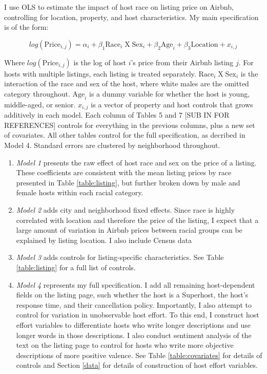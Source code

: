 \label{empirical}

I use OLS to estimate the impact of host race on listing price on Airbnb, controlling for location, property, and host characteristics. My main specification is of the form:

\[ log(\text{Price}_{i,j}) = \alpha_i + \beta_1 \text{Race}_{i} \;  \text{X} \; \text{Sex}_i + \beta_2 \text{Age}_i + \beta_3 \text{Location} +  x_{i,j} \]

Where $log(\text{Price}_{i,j})$ is the log of host $i$'s price from their Airbnb listing $j$. For hosts with multiple listings, each listing is treated separately. $\text{Race}_{i} \;  \text{X} \; \text{Sex}_i$ is the interaction of the race and sex of the host, where white males are the omitted category throughout. $\text{Age}_i$ is a dummy variable for whether the host is young, middle-aged, or senior. $x_{i,j}$ is a vector of property and host controls that grows additively in each model. Each column of Tables 5 and 7 [SUB IN FOR REFERENCES] controls for everything in the previous columns, plus a new set of covariates. All other tables control for the full specification, as decribed in Model 4. Standard errors are clustered by neighborhood throughout.

\begin{enumerate}
	\item \textit{Model 1} presents the raw effect of host race and sex on the price of a listing. These coefficients are consistent with the mean listing prices by race presented in Table \ref{table:listing}, but further broken down by male and female hosts within each racial category.
	
	\item \textit{Model 2} adds city and neighborhood fixed effects. Since race is highly correlated with location and therefore the price of the listing, I expect that a large amount of variation in Airbnb prices between racial groups can be explained by listing location. I also include Census data 
	
	\item \textit{Model 3} adds controls for listing-specific characteristics. See Table \ref{table:listing} for a full list of controls. 
	
	\item \textit{Model 4} represents my full specification. I add all remaining host-dependent fields on the listing page, such whether the host is a Superhost, the host's response time, and their cancellation policy. Importantly, I also attempt to control for variation in unobservable host effort. To this end, I construct host effort variables to differentiate hosts who write longer descriptions and use longer words in those descriptions. I also conduct sentiment analysis of the text on the listing page to control for hosts who write more objective descriptions of more positive valence. See Table \ref{table:covariates} for details of controls and Section \ref{data} for details of construction of host effort variables. 
\end{enumerate}




